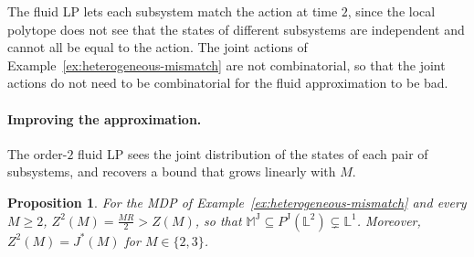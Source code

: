 \documentclass{article}
\newtheorem{proposition}{Proposition}
\begin{document}
The fluid LP lets each subsystem match the action at time $2$, since the local polytope does not see that the states
of different subsystems are independent and cannot all be equal to the action. The joint actions of
Example~\ref{ex:heterogeneous-mismatch} are not combinatorial, so that the joint actions do not need to be
combinatorial for the fluid approximation to be bad.

\paragraph{Improving the approximation.} The order-$2$ fluid LP sees the joint distribution of the states of each pair
of subsystems, and recovers a bound that grows linearly with $M$.

\begin{proposition}
\label{prop:pairwise-gap}
For the MDP of Example~\ref{ex:heterogeneous-mismatch} and every $M \geq 2$, $Z^2(M) = \frac{MR}{2} > Z(M)$, so that
$\mathbb{M}^{\mathrm{J}} \subseteq P^{\mathrm{J}}(\mathbb{L}^2) \subsetneq \mathbb{L}^1$. Moreover, $Z^2(M) = J^*(M)$ for
$M \in \{2,3\}$.
\end{proposition}
\end{document}
